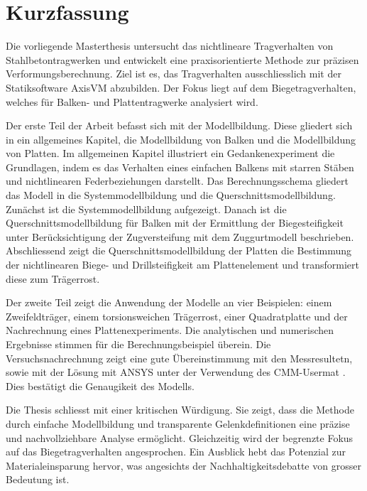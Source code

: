 \chapter*{Kurzfassung}

Die vorliegende Masterthesis untersucht das nichtlineare Tragverhalten von Stahlbetontragwerken und entwickelt eine praxisorientierte Methode zur präzisen Verformungsberechnung. Ziel ist es, das Tragverhalten ausschliesslich mit der Statiksoftware AxisVM abzubilden. Der Fokus liegt auf dem Biegetragverhalten, welches für Balken- und Plattentragwerke analysiert wird.

Der erste Teil der Arbeit befasst sich mit der Modellbildung. Diese gliedert sich in ein allgemeines Kapitel, die Modellbildung von Balken und die Modellbildung von Platten. Im allgemeinen Kapitel illustriert ein Gedankenexperiment die Grundlagen, indem es das Verhalten eines einfachen Balkens mit starren Stäben und nichtlinearen Federbeziehungen darstellt. Das Berechnungsschema gliedert das Modell in die Systemmodellbildung und die Querschnittsmodellbildung. Zunächst ist die Systemmodellbildung aufgezeigt. Danach ist die Querschnittsmodellbildung für Balken mit der Ermittlung der  Biegesteifigkeit unter Berücksichtigung der Zugversteifung mit dem Zuggurtmodell beschrieben. Abschliessend zeigt die Querschnittsmodellbildung der Platten die Bestimmung der nichtlinearen Biege- und Drillsteifigkeit am Plattenelement und transformiert diese zum Trägerrost.

Der zweite Teil zeigt die Anwendung der Modelle an vier Beispielen: einem Zweifeldträger, einem torsionsweichen Trägerrost, einer Quadratplatte und der Nachrechnung eines Plattenexperiments. Die analytischen und numerischen Ergebnisse stimmen für die Berechnungsbeispiel überein. Die Versuchsnachrechnung zeigt eine gute Übereinstimmung mit den Messresultetn, sowie mit der Lösung mit ANSYS unter der Verwendung des CMM-Usermat . Dies bestätigt die Genaugikeit des Modells.

Die Thesis schliesst mit einer kritischen Würdigung. Sie zeigt, dass die Methode durch einfache Modellbildung und transparente Gelenkdefinitionen eine präzise und nachvollziehbare Analyse ermöglicht. Gleichzeitig wird der begrenzte Fokus auf das Biegetragverhalten angesprochen. Ein Ausblick hebt das Potenzial zur Materialeinsparung hervor, was angesichts der Nachhaltigkeitsdebatte von grosser Bedeutung ist.